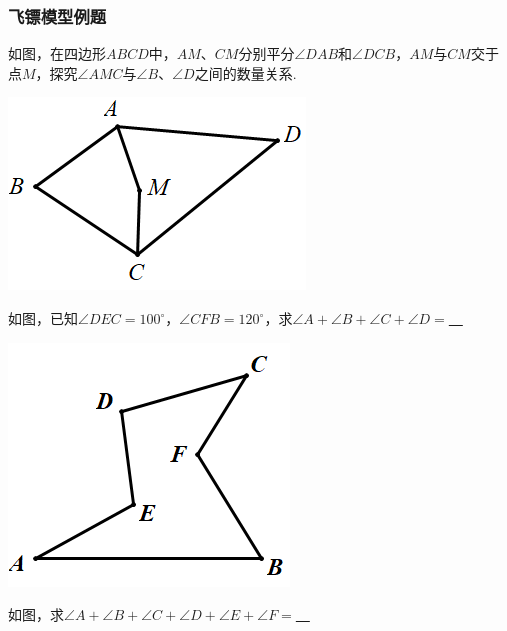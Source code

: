 \documentclass[10pt]{ctexart}
\begin{document}
\subsubsection{飞镖模型例题}
\begin{shaded}
\begin{example}
如图，在四边形$ABCD$中，$AM$、$CM$分别平分$\angle DAB$和$\angle DCB$，$AM$与$CM$交于点$M$，探究$\angle AMC$与$\angle B$、$\angle D$之间的数量关系.
\end{example}
\end{shaded}
 \includegraphics[scale=0.5]{figure/feibiao04.PNG}

\begin{shaded} 
\begin{example}
如图，已知$\angle DEC=100^\circ$，$\angle CFB=120^\circ$，求$\angle A+\angle B+\angle C+\angle D=$\underline{~\hspace{1cm}~}
\end{example}
\end{shaded}

 \includegraphics[scale=0.5]{figure/feibiao05.PNG}

\begin{shaded}
\begin{example}
如图，求$\angle A+\angle B+\angle C+\angle D+\angle E+\angle F=$\underline{~\hspace{1cm}~}
\end{example}
\end{shaded}
\end{document}
